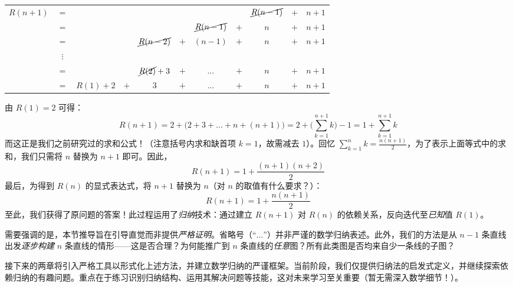 \begin{center}
    \begin{tabular}{rcccccccccc}
        $R(n+1)$ & $=$ &          & &            &     &            &     & $\cancel{R(n-1)}$ & $+$ & $n+1$\\
                 & $=$ &          & &                   &     & $\cancel{R(n-1)}$ & $+$ & $n$ & $+$ & $n+1$\\
                 & $=$ &          & & $\cancel{R(n-2)}$ & $+$ & $(n-1)$           & $+$ & $n$ & $+$ & $n+1$\\
                 & $\vdots$ &     & &  &  &  &  &  &  & \\
                 & $=$ &          & & $\cancel{R(2)}+3$ & $+$ & $\dots$ & $+$ & $n$ & $+$ & $n+1$ \\
                 & $=$ & $R(1)+2$ & $+$ & $3$               & $+$ & $\dots$ & $+$ & $n$ & $+$ & $n+1$ \\
    \end{tabular}
\end{center}

由 $R(1) = 2$ 可得：
\[R(n + 1) = 2 + \big(2 + 3 + \dots + n + (n + 1)\big) = 2 + \Bigg(\sum_{k=1}^{n+1}k\Bigg)-1 = 1+\sum_{k=1}^{n+1}k\]
而这正是我们之前研究过的求和公式！（注意括号内求和缺首项 $k=1$，故需减去 $1$）。回忆 $\sum_{k=1}^{n} k = \frac{n(n+1)}{2}$，为了表示上面等式中的求和，我们只需将 $n$ 替换为 $n + 1$ 即可。因此，
\[R(n + 1) = 1+\frac{(n+1)(n+2)}{2}\]
最后，为得到 $R(n)$ 的显式表达式，将 $n+1$ 替换为 $n$（对 $n$ 的取值有什么要求？）：
\[R(n + 1) = 1+\frac{n(n+1)}{2}\]
至此，我们获得了原问题的答案！此过程运用了\emph{归纳}技术：通过建立 $R(n + 1)$ 对 $R(n)$ 的依赖关系，反向迭代至\emph{已知}值 $R(1)$。

需要强调的是，本节推导旨在引导直觉而非提供\emph{严格证明}。省略号（``$\dots$''）并非严谨的数学归纳表述。此外，我们的方法是从 $n - 1$ 条直线出发\emph{逐步构建} $n$ 条直线的情形——这是否合理？为何能推广到 $n$ 条直线的\emph{任意}图？所有此类图是否均来自少一条线的子图？

接下来的两章将引入严格工具以形式化上述方法，并建立数学归纳的严谨框架。当前阶段，我们仅提供归纳法的启发式定义，并继续探索依赖归纳的有趣问题。重点在于练习识别归纳结构、运用其解决问题等技能，这对未来学习至关重要（暂无需深入数学细节！）。
